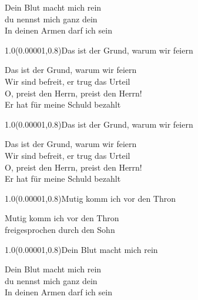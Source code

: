 \documentclass[aspectratio=169]{beamer}
\begin{document}
\begin{frame}
\centering
\color{white}
\huge{Dein Blut macht mich rein} \\
\huge{du nennst mich ganz dein} \\
\huge{In deinen Armen darf ich sein} \\

\begin{textblock}{1.0}(0.00001,0.8)\color{gray}\normalsize{Das ist der Grund, warum wir feiern}\end{textblock}
\end{frame}

\begin{frame}
\centering
\color{white}
\huge{Das ist der Grund, warum wir feiern} \\
\huge{Wir sind befreit, er trug das Urteil} \\
\huge{O, preist den Herrn, preist den Herrn!} \\
\huge{Er hat für meine Schuld bezahlt} \\

\begin{textblock}{1.0}(0.00001,0.8)\color{gray}\normalsize{Das ist der Grund, warum wir feiern}\end{textblock}
\end{frame}

\begin{frame}
\centering
\color{white}
\huge{Das ist der Grund, warum wir feiern} \\
\huge{Wir sind befreit, er trug das Urteil} \\
\huge{O, preist den Herrn, preist den Herrn!} \\
\huge{Er hat für meine Schuld bezahlt} \\

\begin{textblock}{1.0}(0.00001,0.8)\color{gray}\normalsize{Mutig komm ich vor den Thron}\end{textblock}
\end{frame}

\begin{frame}
\centering
\color{white}
\huge{Mutig komm ich vor den Thron} \\
\huge{freigesprochen durch den Sohn} \\

\begin{textblock}{1.0}(0.00001,0.8)\color{gray}\normalsize{Dein Blut macht mich rein}\end{textblock}
\end{frame}

\begin{frame}
\centering
\color{white}
\huge{Dein Blut macht mich rein} \\
\huge{du nennst mich ganz dein} \\
\huge{In deinen Armen darf ich sein} \\
\end{frame}
\end{document}
